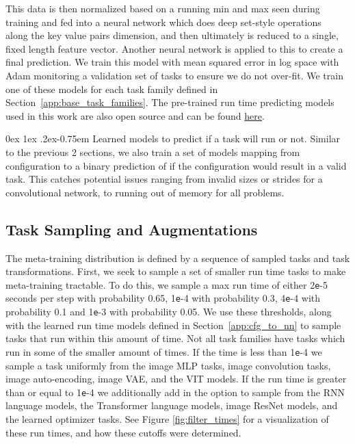 \documentclass[11pt]{article}
\makeatletter
\renewcommand{\paragraph}{%
  \@startsection{paragraph}{4}%
  {\z@}{0ex \@plus 1ex \@minus .2ex}{-0.75em}%
  {\normalfont\normalsize\bfseries}%
}
\newcommand{\e}{\texttt{e}}
\makeatother
\begin{document}
This data is then normalized based on a running min and max seen during training and fed into a neural network which does deep set-style operations~\citep{zaheer2017deep} along the key value pairs dimension, and then ultimately is reduced to a single, fixed length feature vector.
Another neural network is applied to this to create a final prediction.
We train this model with mean squared error in log space with Adam monitoring a validation set of tasks to ensure we do not over-fit.
We train one of these models for each task family defined in Section~\ref{app:base_task_families}. The pre-trained run time predicting models used in this work are also open source and can be found \href{https://github.com/google/learned_optimization/blob/687e72e7b5596dfb80c5196fd51f43058899edd9/learned_optimization/time_filter/model_paths.py#L19}{here}.

\paragraph{Learned models to predict if a task will run or not.}
Similar to the previous 2 sections, we also train a set of models mapping from configuration to a binary prediction of if the configuration would result in a valid task.
This catches potential issues ranging from invalid sizes or strides for a convolutional network, to running out of memory for all problems.

\subsection{Task Sampling and Augmentations}\label{app:meta_training_task_distribution}
The meta-training distribution is defined by a sequence of sampled tasks and task transformations.
First, we seek to sample a set of smaller run time tasks to make meta-training tractable.
To do this, we sample a max run time of either 2\e-5 seconds per step with probability 0.65, 1\e-4 with probability 0.3, 4\e-4 with probability 0.1 and 1\e-3 with probability 0.05. 
We use these thresholds, along with the learned run time models defined in Section~\ref{app:cfg_to_nn} to sample tasks that run within this amount of time.
Not all task families have tasks which run in some of the smaller amount of times.
If the time is less than 1\e-4 we sample a task uniformly from the image MLP tasks, image convolution tasks, image auto-encoding, image VAE, and the VIT models.
If the run time is greater than or equal to 1\e-4 we additionally add in the option to sample from the RNN language models, the Transformer language models, image ResNet models, and the learned optimizer tasks. See Figure \ref{fig:filter_times} for a visualization of these run times, and how these cutoffs were determined.
\end{document}
